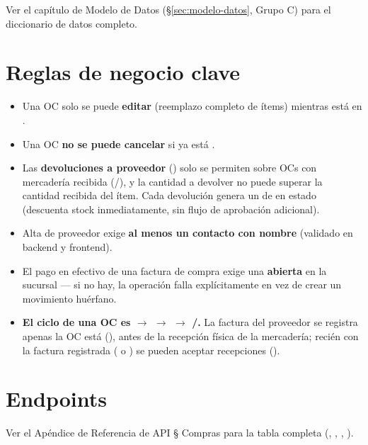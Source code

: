 Ver el capítulo de Modelo de Datos (\S\ref{sec:modelo-datos}, Grupo C) para el diccionario de datos completo.

\section{Reglas de negocio clave}
\label{sec:compras-reglas}

\begin{itemize}
  \item Una OC solo se puede \textbf{editar} (reemplazo completo de ítems) mientras está en .
  \item Una OC \textbf{no se puede cancelar} si ya está .
  \item Las \textbf{devoluciones a proveedor} (\allowbreak {}) solo se permiten sobre OCs con mercadería recibida (/), y la cantidad a devolver no puede superar la cantidad recibida del ítem. Cada devolución genera un  de  en estado  (descuenta stock inmediatamente, sin flujo de aprobación adicional).
  \item Alta de proveedor exige \textbf{al menos un contacto con nombre} (validado en backend y frontend).
  \item El pago en efectivo de una factura de compra exige una  \textbf{abierta} en la sucursal --- si no hay, la operación falla explícitamente en vez de crear un movimiento huérfano.
  \item \textbf{El ciclo de una OC es  $\to$  $\to$  $\to$ /\allowbreak {}.} La factura del proveedor se registra apenas la OC está  (\allowbreak {}\allowbreak {}), antes de la recepción física de la mercadería; recién con la factura registrada ( o ) se pueden aceptar recepciones (\allowbreak {}).
\end{itemize}

\section{Endpoints}
\label{sec:compras-endpoints}

Ver el Apéndice de Referencia de API § Compras para la tabla completa (, \allowbreak {}, \allowbreak {}\allowbreak {}, \allowbreak {}).

